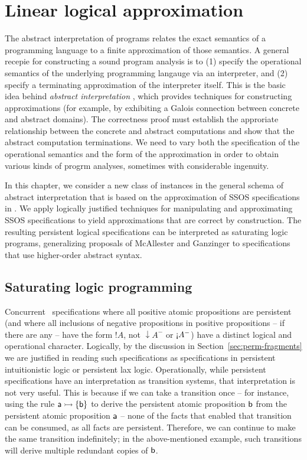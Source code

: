 \chapter{Linear logical approximation}
\label{chapter-approx}

The abstract interpretation of programs relates the exact semantics of
a programming language to a finite approximation of those semantics. A
general recepie for constructing a sound program analysis is to (1)
specify the operational semantics of the underlying programming
langauge via an interpreter, and (2) specify a terminating
approximation of the interpreter itself. This is the basic idea behind
{\it abstract interpretation} \cite{cousot77abstract}, which provides
techniques for constructing approximations (for example, by exhibiting
a Galois connection between concrete and abstract domains). The
correctness proof must establish the approriate relationship between
the concrete and abstract computations and show that the abstract
computation terminations. We need to vary both the specification of
the operational semantics and the form of the approximation in order
to obtain various kinds of progrm analyses, sometimes with
considerable ingenuity.

In this chapter, we consider a new class of instances in the general
schema of abstract interpretation that is based on the approximation
of SSOS specifications in \sls. We apply logically justified
techniques for manipulating and approximating SSOS specifications to
yield approximations that are correct by construction. The resulting
persistent logical specifications can be interpreted as saturating
logic programs, generalizing proposals of McAllester and Ganzinger
\cite{mcallester02complexity,ganzinger02logical} to specifications
that use higher-order abstract syntax.

\section{Saturating logic programming}

Concurrent \sls~specifications where all positive atomic propositions
are persistent (and where all inclusions of negative propositions in
positive propositions -- if there are any -- have the form ${!}A$, not
${\downarrow}A^-$ or ${\gnab}A^-$) have a distinct logical and
operational character. Logically, by the discussion in
Section~\ref{sec:perm-fragments} we are justified in reading such
specifications as specifications in persistent intuitionistic logic or
persistent lax logic. Operationally, while persistent specifications
have an interpretation as transition systems, that interpretation is
not very useful. This is because if we can take a transition once --
for instance, using the rule ${\sf a} \rightarrowtail \{ {\sf b} \}$ to derive
the persistent atomic proposition ${\sf b}$ from the persistent atomic
proposition ${\sf a}$ -- none of the facts that enabled that
transition can be consumed, as all facts are persistent. Therefore, we
can continue to make the same transition indefinitely; in the
above-mentioned example, such transitions will derive multiple
redundant copies of ${\sf b}$.

